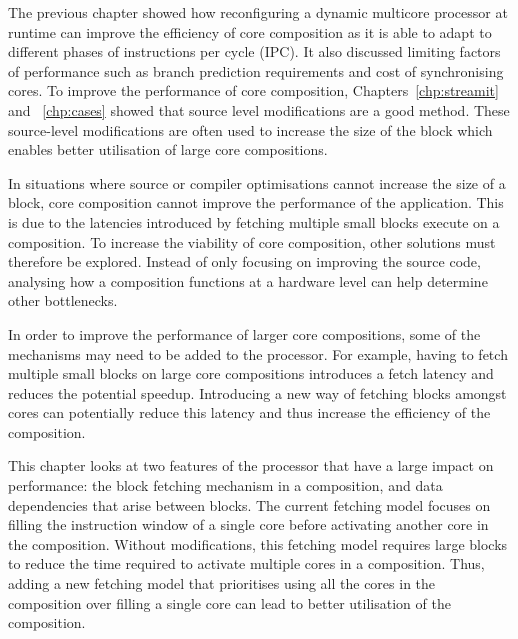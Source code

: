 The previous chapter showed how reconfiguring a dynamic multicore processor at runtime can improve the efficiency of core composition as it is able to adapt to different phases of instructions per cycle (IPC).
It also discussed limiting factors of performance such as branch prediction requirements and cost of synchronising cores.
To improve the performance of core composition, Chapters~\ref{chp:streamit} and ~\ref{chp:cases} showed that source level modifications are a good method.
These source-level modifications are often used to increase the size of the block which enables better utilisation of large core compositions.

In situations where source or compiler optimisations cannot increase the size of a block, core composition cannot improve the performance of the application.
This is due to the latencies introduced by fetching multiple small blocks execute on a composition.
To increase the viability of core composition, other solutions must therefore be explored.
Instead of only focusing on improving the source code, analysing how a composition functions at a hardware level can help determine other bottlenecks.

In order to improve the performance of larger core compositions, some of the mechanisms may need to be added to the processor.%
For example, having to fetch multiple small blocks on large core compositions introduces a fetch latency and reduces the potential speedup.
Introducing a new way of fetching blocks amongst cores can potentially reduce this latency and thus increase the efficiency of the composition.

This chapter looks at two features of the processor that have a large impact on performance: the block fetching mechanism in a composition, and data dependencies that arise between blocks.
The current fetching model focuses on filling the instruction window of a single core before activating another core in the composition.
Without modifications, this fetching model requires large blocks to reduce the time required to activate multiple cores in a composition.
Thus, adding a new fetching model that prioritises using all the cores in the composition over filling a single core can lead to better utilisation of the composition.

